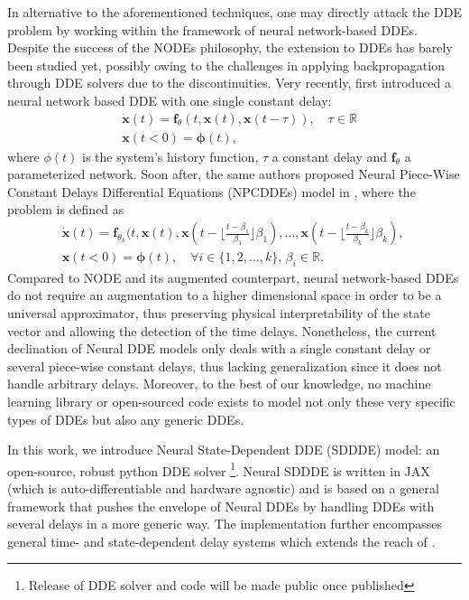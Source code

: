 In alternative to the aforementioned techniques, one may directly attack the DDE problem by working within the framework of neural network-based DDEs. Despite the success of the NODEs philosophy, the extension to DDEs has barely been studied yet, possibly owing to the challenges in applying backpropagation through DDE solvers due to the discontinuities. Very recently, \cite{first_neural_dde} first introduced a neural network based DDE with one single constant delay:
%
\begin{equation}
\begin{aligned}
& \dot{\mathbf{x}}(t) = \mathbf{f}_{\theta}(t, \mathbf{x}(t), \mathbf{x}(t-\tau)), \quad \tau \in \mathbb{R} \\
& \mathbf{x}(t<0) = \mathbf{\phi}(t),
\end{aligned}
\label{eqn:first_neural_dde}
\end{equation}
%
where $\phi(t)$ is the system's history function, $\tau$ a constant delay and $ \mathbf{f}_{\theta}$ a parameterized network. Soon after, the same authors proposed Neural Piece-Wise Constant Delays Differential Equations (NPCDDEs) model in \cite{neural_piece_wise_dde}, where the problem is defined as 
%
\begin{equation}
\begin{aligned}
&\dot{\mathbf{x}}(t) = \mathbf{f}_{\theta_{k}}(t, \mathbf{x}(t), \mathbf{x}(t-\lfloor \frac{t-\beta_1}{\beta_1} \rfloor \beta_1),\dots,  \mathbf{x}(t-\lfloor \frac{t-\beta_k}{\beta_k} \rfloor \beta_k), \quad 
\\
& \mathbf{x}(t<0) = \mathbf{\phi}(t), \quad \forall i \in \{1, 2, \ldots, k\}, \, \beta_i \in \mathbb{R}.
\end{aligned}
\label{eqn:npcddes}
\end{equation}
%
Compared to NODE and its augmented counterpart, neural network-based DDEs do not require an augmentation to a higher dimensional space in order to be a universal approximator, thus preserving physical interpretability of the state vector and allowing the detection of the time delays. Nonetheless, the current declination of Neural DDE models only deals with a single constant delay or several piece-wise constant delays, thus lacking generalization since it does not handle arbitrary delays. Moreover, to the best of our knowledge, no machine learning library or open-sourced code exists to model not only these very specific types of DDEs but also any generic DDEs. 

In this work, we introduce Neural State-Dependent DDE (SDDDE) model: an open-source, robust python DDE solver \footnote{Release of DDE solver and code will be made public once published}. Neural SDDDE is written in JAX (which is auto-differentiable and hardware agnostic) and is based on a general framework that pushes the envelope of Neural DDEs by handling DDEs with several delays in a more generic way. The implementation further encompasses general time- and state-dependent delay systems which extends the reach of \cite{neural_piece_wise_dde}. 

